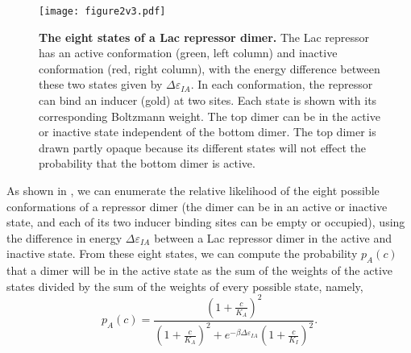 \begin{figure}[h]
	\centering \texttt{[image: figure2v3.pdf]}
	\caption{{\bf The eight states of a Lac repressor dimer. } The Lac repressor has
		an active conformation (green, left column) and inactive conformation (red,
		right column), with the energy difference between these two states given by
		$\Delta \varepsilon_{IA}$. In each conformation, the repressor can bind an inducer (gold) at
		two sites. Each state is shown with its corresponding Boltzmann weight. The top
		dimer can be in the active or inactive state independent of the bottom dimer.
		The top dimer is drawn partly opaque because its different states will not
		effect the probability that the bottom dimer is active. %
	} \label{figrepressorInducerStates}
\end{figure}

As shown in \fref[figrepressorInducerStates], we can enumerate the relative
likelihood of the eight possible conformations of a repressor dimer (the dimer
can be in an active or inactive state, and each of its two inducer binding sites
can be empty or occupied), using the difference in energy $\Delta \varepsilon_{IA}$ between a
Lac repressor dimer in the active and inactive state. From these eight states, we can
compute the probability \(p_A(c)\) that a dimer will be in the active state
as the sum of the weights of the active states divided by the sum of the weights
of every possible state, namely,
\begin{equation}\label{eq6}
p_A(c)=\frac{\left(1+\frac{c}{K_A}\right)^2}{\left(1+\frac{c}{K_A}\right)^2+e^{-\beta  \Delta \varepsilon_{IA} }\left(1+\frac{c}{K_I}\right)^2}.
\end{equation}


